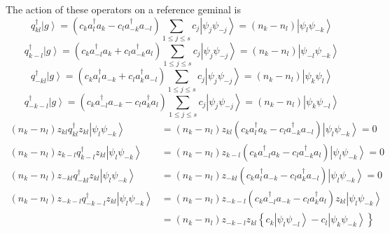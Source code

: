 \documentclass[aps,preprint]{revtex4}%
\begin{document}
The action of these operators on a reference geminal is%
\begin{equation}
q_{kl}^{\dagger}\left\vert g\right\rangle =\left(  c_{k}a_{l}^{\dagger}%
a_{k}-c_{l}a_{-k}^{\dagger}a_{-l}\right)  \sum_{1\leq j\leq s}c_{j}\left\vert
\psi_{j}\psi_{-j}\right\rangle =\left(  n_{k}-n_{l}\right)  \left\vert
\psi_{l}\psi_{-k}\right\rangle
\end{equation}%
\begin{equation}
q_{k-l}^{\dagger}\left\vert g\right\rangle =\left(  c_{k}a_{-l}^{\dagger}%
a_{k}+c_{l}a_{-k}^{\dagger}a_{l}\right)  \sum_{1\leq j\leq s}c_{j}\left\vert
\psi_{j}\psi_{-j}\right\rangle =\left(  n_{k}-n_{l}\right)  \left\vert
\psi_{-l}\psi_{-k}\right\rangle
\end{equation}%
\begin{equation}
q_{-kl}^{\dagger}\left\vert g\right\rangle =\left(  c_{k}a_{l}^{\dagger}%
a_{-k}+c_{l}a_{k}^{\dagger}a_{-l}\right)  \sum_{1\leq j\leq s}c_{j}\left\vert
\psi_{j}\psi_{-j}\right\rangle =\left(  n_{k}-n_{l}\right)  \left\vert
\psi_{k}\psi_{l}\right\rangle
\end{equation}%
\begin{equation}
q_{-k-l}^{\dagger}\left\vert g\right\rangle =\left(  c_{k}a_{-l}^{\dagger
}a_{-k}-c_{l}a_{k}^{\dagger}a_{l}\right)  \sum_{1\leq j\leq s}c_{j}\left\vert
\psi_{j}\psi_{-j}\right\rangle =\left(  n_{k}-n_{l}\right)  \left\vert
\psi_{k}\psi_{-l}\right\rangle
\end{equation}%
\begin{align}
\left(  n_{k}-n_{l}\right)  z_{kl}q_{kl}^{\dagger}z_{kl}\left\vert \psi
_{l}\psi_{-k}\right\rangle  &  =\left(  n_{k}-n_{l}\right)  z_{kl}\left(
c_{k}a_{l}^{\dagger}a_{k}-c_{l}a_{-k}^{\dagger}a_{-l}\right)  \left\vert
\psi_{l}\psi_{-k}\right\rangle =0\nonumber\\
\left(  n_{k}-n_{l}\right)  z_{k-l}q_{k-l}^{\dagger}z_{kl}\left\vert \psi
_{l}\psi_{-k}\right\rangle  &  =\left(  n_{k}-n_{l}\right)  z_{k-l}\left(
c_{k}a_{-l}^{\dagger}a_{k}-c_{l}a_{-k}^{\dagger}a_{l}\right)  \left\vert
\psi_{l}\psi_{-k}\right\rangle =0\nonumber\\
\left(  n_{k}-n_{l}\right)  z_{-kl}q_{-kl}^{\dagger}z_{kl}\left\vert \psi
_{l}\psi_{-k}\right\rangle  &  =\left(  n_{k}-n_{l}\right)  z_{-kl}\left(
c_{k}a_{l}^{\dagger}a_{-k}-c_{l}a_{k}^{\dagger}a_{-l}\right)  \left\vert
\psi_{l}\psi_{-k}\right\rangle =0\nonumber\\
\left(  n_{k}-n_{l}\right)  z_{-k-l}q_{-k-l}^{\dagger}z_{kl}\left\vert
\psi_{l}\psi_{-k}\right\rangle  &  =\left(  n_{k}-n_{l}\right)  z_{-k-l}%
\left(  c_{k}a_{-l}^{\dagger}a_{-k}-c_{l}a_{k}^{\dagger}a_{l}\right)
z_{kl}\left\vert \psi_{l}\psi_{-k}\right\rangle \nonumber\\
&  =\left(  n_{k}-n_{l}\right)  z_{-k-l}z_{kl}\left\{  c_{k}\left\vert
\psi_{l}\psi_{-l}\right\rangle -c_{l}\left\vert \psi_{k}\psi_{-k}\right\rangle
\right\}
\end{align}
%
\end{document}
